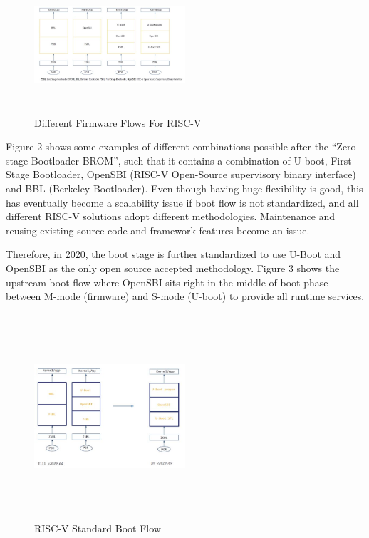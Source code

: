 \documentclass[a4paper,fleqn]{cas-dc}
\begin{document}
\begin{figure}[hbt!]
	\centering
	\includegraphics[width=0.5\textwidth,height=2in]{figs/DifferentFirmwareFlowsForRiscV.JPG}
	\caption{Different Firmware Flows For RISC-V}
\end{figure}

Figure 2 shows some examples of different combinations possible after the “Zero stage Bootloader BROM”, such that it contains a combination of U-boot, First Stage Bootloader, OpenSBI (RISC-V Open-Source supervisory binary interface) and BBL (Berkeley Bootloader). Even though having huge flexibility is good, this has eventually become a scalability issue if boot flow is not standardized, and all different RISC-V solutions adopt different methodologies. Maintenance and reusing existing source code and framework features become an issue.

Therefore, in 2020, the boot stage is further standardized to use U-Boot and OpenSBI as the only open source accepted methodology. Figure 3 shows the upstream boot flow where OpenSBI sits right in the middle of boot phase between M-mode (firmware) and S-mode (U-boot) to provide all runtime services.

\begin{figure}[hbt!]
	\centering
	\includegraphics[width=0.5\textwidth,height=3in]{figs/RiscVStandardBootFlow.JPG}
	\caption{RISC-V Standard Boot Flow}
\end{figure}
\end{document}
